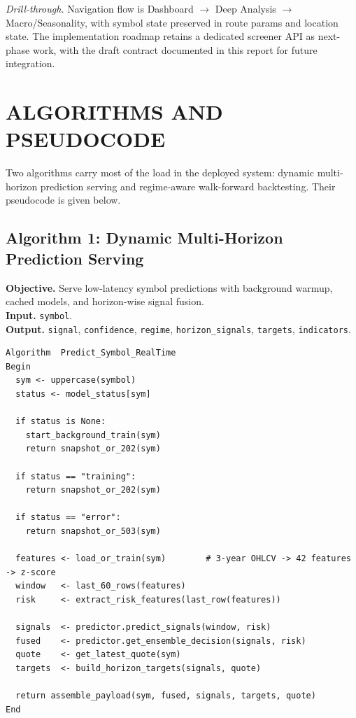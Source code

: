 \documentclass[12pt,a4paper]{report}
\numberwithin{equation}{chapter}
\begin{document}
\textit{Drill-through.} Navigation flow is Dashboard $\rightarrow$ Deep Analysis $\rightarrow$ Macro/Seasonality, with symbol state preserved in route params and location state.
The implementation roadmap retains a dedicated screener API as next-phase work, with the draft contract documented in this report for future integration.

\section{ALGORITHMS AND PSEUDOCODE}

Two algorithms carry most of the load in the deployed system: dynamic multi-horizon prediction serving and regime-aware walk-forward backtesting. Their pseudocode is given below.

\subsection{Algorithm 1: Dynamic Multi-Horizon Prediction Serving}

\textbf{Objective.} Serve low-latency symbol predictions with background warmup, cached models, and horizon-wise signal fusion.\\
\textbf{Input.} \texttt{symbol}.\\
\textbf{Output.} \texttt{signal}, \texttt{confidence}, \texttt{regime}, \texttt{horizon\_signals}, \texttt{targets}, \texttt{indicators}.

\begin{lstlisting}[breaklines=true]
Algorithm  Predict_Symbol_RealTime
Begin
  sym <- uppercase(symbol)
  status <- model_status[sym]

  if status is None:
    start_background_train(sym)
    return snapshot_or_202(sym)

  if status == "training":
    return snapshot_or_202(sym)

  if status == "error":
    return snapshot_or_503(sym)

  features <- load_or_train(sym)        # 3-year OHLCV -> 42 features -> z-score
  window   <- last_60_rows(features)
  risk     <- extract_risk_features(last_row(features))

  signals  <- predictor.predict_signals(window, risk)
  fused    <- predictor.get_ensemble_decision(signals, risk)
  quote    <- get_latest_quote(sym)
  targets  <- build_horizon_targets(signals, quote)

  return assemble_payload(sym, fused, signals, targets, quote)
End
\end{lstlisting}
\end{document}
